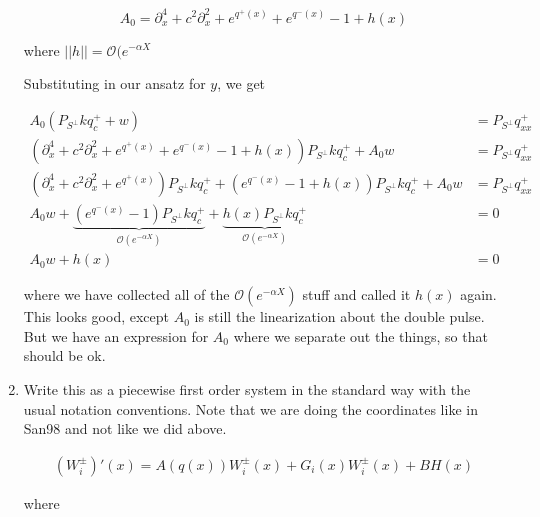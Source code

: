 \documentclass[12pt]{article}
\begin{document}
\begin{enumerate}
\[
A_0 = \partial_x^4 + c^2 \partial_x^2 + e^{q^+(x)} + e^{q^-(x)} - 1 + h(x)
\]

where $||h|| = \mathcal{O}(e^{-\alpha X}$

Substituting in our ansatz for $y$, we get

\begin{align*}
A_0 (P_{S^\perp} k q^+_c + w) &= P_{S^\perp} q^+_{xx} \\
(\partial_x^4 + c^2 \partial_x^2 + e^{q^+(x)} + e^{q^-(x)} - 1 + h(x))P_{S^\perp} k q^+_c + A_0 w &= P_{S^\perp} q^+_{xx} \\
(\partial_x^4 + c^2 \partial_x^2 + e^{q^+(x)})P_{S^\perp} k q^+_c + (e^{q^-(x)} - 1 + h(x))P_{S^\perp}k q^+_c + A_0 w &= P_{S^\perp} q^+_{xx} \\
A_0 w + \underbrace{(e^{q^-(x)} - 1) P_{S^\perp} k q^+_c}_{\mathcal{O}(e^{-\alpha X})} 
+ \underbrace{h(x) P_{S^\perp}k q^+_c}_{\mathcal{O}(e^{-\alpha X})} &= 0 \\
A_0 w + h(x) &= 0
\end{align*}

where we have collected all of the $\mathcal{O}(e^{-\alpha X})$ stuff and called it $h(x)$ again. This looks good, except $A_0$ is still the linearization about the double pulse. But we have an expression for $A_0$ where we separate out the things, so that should be ok.

\item Write this as a piecewise first order system in the standard way with the usual notation conventions. Note that we are doing the coordinates like in San98 and not like we did above.

\begin{align*}
(W_i^\pm)'(x) = A(q(x)) W_i^\pm(x) + G_i(x) W_i^\pm(x)+ B H(x)
\end{align*}

where


\end{enumerate}
\end{document}
